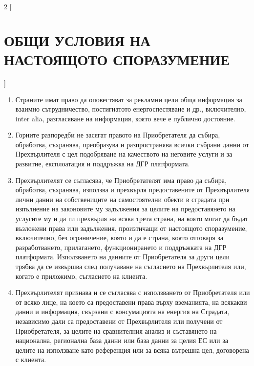 \begin{multicols}{2} [\section{ОБЩИ УСЛОВИЯ НА НАСТОЯЩОТО
    СПОРАЗУМЕНИЕ}]
\begin{enumerate}
\begin{enumerate}
      клаузите на настоящия договор; и
    \item разкриващата информация страна трябва да уведоми незабавно
      другата страна, освен ако не е предвидено друго от разпоредбите
      на приложимото право.
    \end{enumerate}
  \item Страните имат право да оповестяват за рекламни цели обща
    информация за взаимно сътрудничество, постигнатото
    енергоспестяване и др., включително, inter alia, разгласяване на
    информация, която вече е публично достояние.
  \item Горните разпоредби не засягат правото на Приобретателя да
    събира, обработва, съхранява, преобразува и разпространява всички
    събрани данни от Прехвърлителя с цел подобряване на качеството на
    неговите услуги и за развитие, експлоатация и поддръжка на ДГР
    платформата.
  \item Прехвърлителят се съгласява, че Приобретателят има право да
    събира, обработва, съхранява, използва и прехвърля предоставените
    от Прехвърлителя лични данни на собствениците на самостоятелни
    обекти в сградата при изпълнение на законовите му задължения за
    целите на предоставянето на услугите му и да ги прехвърля на всяка
    трета страна, на която могат да бъдат възложени права или
    задължения, произтичащи от настоящото споразумение, включително,
    без ограничение, която и да е страна, която отговаря за
    разработването, прилагането, функционирането и поддръжката на ДГР
    платформата. Използването на данните от Приобретателя за други
    цели трябва да се извършва след получаване на съгласието на
    Прехвърлителя или, когато е приложимо, съгласието на клиента.
  \item Прехвърлителят признава и се съгласява с използването от
    Приобретателя или от всяко лице, на което са предоставени права
    върху вземанията, на всякакви данни и информация, свързани с
    консумацията на енергия на Сградата, независимо дали са
    предоставени от Прехвърлителя или получени от Приобретателя, за
    целите на сравнителния анализ и съставянето на национална,
    регионална база данни или база данни за целия ЕС или за целите на
    използване като референция или за всяка вътрешна цел, договорена с
    клиента.
  \end{enumerate}


\end{multicols}
